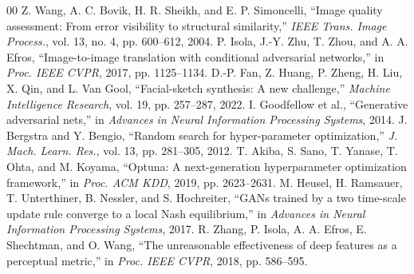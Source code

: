 \documentclass[conference]{IEEEtran}
\begin{document}
\begin{thebibliography}{00}
 Z. Wang, A. C. Bovik, H. R. Sheikh, and E. P. Simoncelli, ``Image quality assessment: From error visibility to structural similarity,'' \emph{IEEE Trans. Image Process.}, vol. 13, no. 4, pp. 600--612, 2004.
 P. Isola, J.-Y. Zhu, T. Zhou, and A. A. Efros, ``Image-to-image translation with conditional adversarial networks,'' in \emph{Proc. IEEE CVPR}, 2017, pp. 1125--1134.
 D.-P. Fan, Z. Huang, P. Zheng, H. Liu, X. Qin, and L. Van Gool, ``Facial-sketch synthesis: A new challenge,'' \emph{Machine Intelligence Research}, vol. 19, pp. 257--287, 2022.
 I. Goodfellow et al., ``Generative adversarial nets,'' in \emph{Advances in Neural Information Processing Systems}, 2014.
 J. Bergstra and Y. Bengio, ``Random search for hyper-parameter optimization,'' \emph{J. Mach. Learn. Res.}, vol. 13, pp. 281--305, 2012.
 T. Akiba, S. Sano, T. Yanase, T. Ohta, and M. Koyama, ``Optuna: A next-generation hyperparameter optimization framework,'' in \emph{Proc. ACM KDD}, 2019, pp. 2623--2631.
 M. Heusel, H. Ramsauer, T. Unterthiner, B. Nessler, and S. Hochreiter, ``GANs trained by a two time-scale update rule converge to a local Nash equilibrium,'' in \emph{Advances in Neural Information Processing Systems}, 2017.
 R. Zhang, P. Isola, A. A. Efros, E. Shechtman, and O. Wang, ``The unreasonable effectiveness of deep features as a perceptual metric,'' in \emph{Proc. IEEE CVPR}, 2018, pp. 586--595.
\end{thebibliography}
\end{document}
